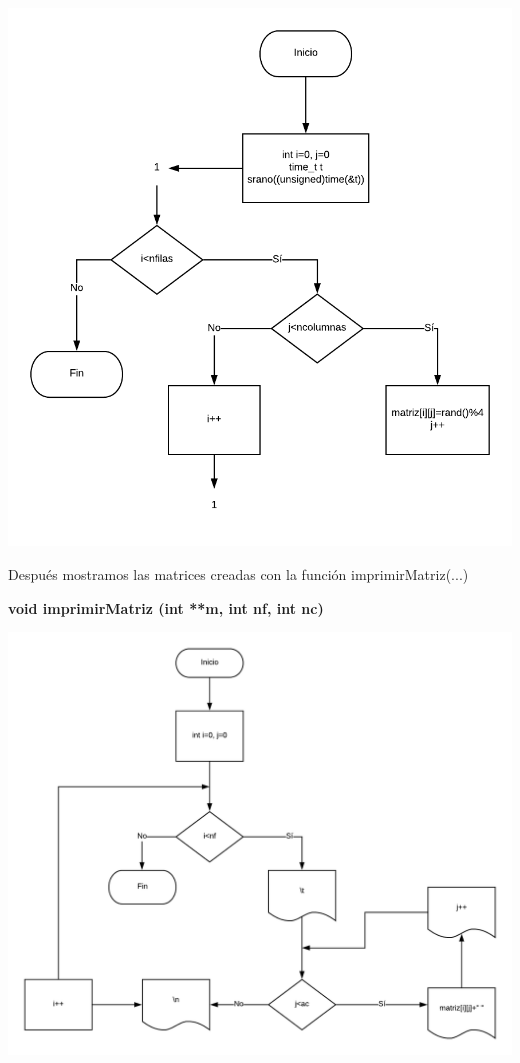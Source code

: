 \documentclass[10pt,a4paper]{article}
\begin{document}
\begin{center}
	\includegraphics[scale=0.7]{llenarMatriz.png} 
\end{center}

\begin{flushleft}
Después mostramos las matrices creadas con la función imprimirMatriz(...)
\end{flushleft}

\begin{flushleft}
\textbf{void imprimirMatriz (int **m, int nf, int nc)}
\end{flushleft}

\begin{center}
	\includegraphics[scale=0.3]{imprimirMatriz.png} 
\end{center}
\end{document}
